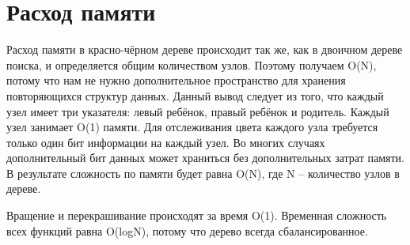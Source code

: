 \documentclass[otchet]{SCWorks}
\begin{document}
\section{Расход памяти}
Расход памяти в красно-чёрном дереве происходит так же, как в двоичном дереве поиска, и определяется общим количеством узлов. Поэтому получаем O(N), потому что нам не нужно дополнительное пространство для хранения повторяющихся структур данных. Данный вывод следует из того, что каждый узел имеет три указателя: левый ребёнок, правый ребёнок и родитель. Каждый узел занимает O(1) памяти. Для отслеживания цвета каждого узла требуется только один бит информации на каждый узел. Во многих случаях дополнительный бит данных может храниться без дополнительных затрат памяти. В результате сложность по памяти будет равна O(N), где N – количество узлов в дереве.

Вращение и перекрашивание происходят за время O(1). Временная сложность всех функций равна O(logN), потому что дерево всегда сбалансированное.


	


\appendix
\end{document}
